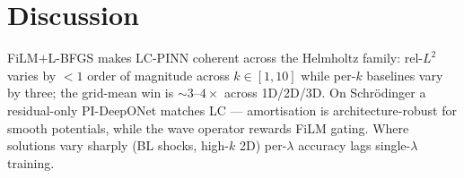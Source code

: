\section{Discussion}
\label{sec:discussion}

FiLM$+$L-BFGS makes LC-PINN coherent across the Helmholtz family:
rel-$L^2$ varies by $<\!1$ order of magnitude across $k\!\in\![1,10]$
while per-$k$ baselines vary by three; the grid-mean win is
$\sim\!3$--$4\times$ across 1D/2D/3D. On Schrödinger a residual-only
PI-DeepONet matches LC --- amortisation is architecture-robust for
smooth potentials, while the wave operator rewards FiLM gating.
Where solutions vary sharply (BL shocks, high-$k$ 2D) per-$\lambda$
accuracy lags single-$\lambda$ training.

